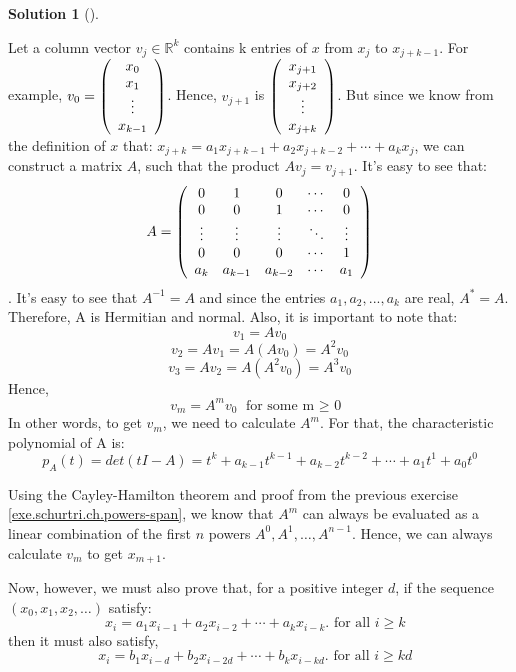 \documentclass[numbers=enddot,12pt,final,onecolumn,notitlepage]{scrartcl}
\newcounter{exer}
\newcounter{sol}
\theoremstyle{definition}
\newtheorem{solu}[sol]{Solution}
\newenvironment{solution}[1][]
{\begin{solu}[#1]\begin{leftbar}}
        {\end{leftbar}\end{solu}}
\begin{document}
\begin{solution}
	Let a column vector $v_j \in \mathbb{R}^k$ contains k entries of $x$ from $x_j$ to $x_{j+k-1}$. For example, $v_0 = \left(\begin{array}[c]{c}
				x_0    \\
				x_1    \\
				\vdots \\
				x_{k-1}
			\end{array}\right)$. Hence, $v_{j+1}$ is
	$\left(\begin{array}[c]{c}
				x_{j+1} \\
				x_{j+2} \\
				\vdots  \\
				x_{j+k}
			\end{array}\right)$.
	But since we know from the definition of $x$ that: $x_{j+k} = a_{1}x_{j+k-1}+a_{2}x_{j+k-2}+\cdots+a_{k}x_{j}$, we can construct a matrix $A$, such that the product $Av_j = v_{j+1}$. It's easy to see that:
	\[
		A = \left(
		\begin{array}
				[c]{ccccc}
				0      & 1       & 0       & \cdots & 0      \\
				0      & 0       & 1       & \cdots & 0      \\
				\vdots & \vdots  & \vdots  & \ddots & \vdots \\
				0      & 0       & 0       & \cdots & 1      \\
				a_{k}  & a_{k-1} & a_{k-2} & \cdots & a_{1}
			\end{array}
		\right)
	\].
	It's easy to see that $A^{-1} = A$ and since the entries $a_1, a_2,...,a_k$ are real, $A^{\ast} = A$. Therefore, A is Hermitian and normal. Also, it is important to note that:
	\[
		v_1 = Av_0
	\]
	\[
		v_2 = Av_1 = A(Av_0) = A^2v_0
	\]
	\[
		v_3 = Av_2 = A(A^2v_0) = A^3v_0
	\]
	Hence,
	\[
		v_m = A^{m}v_0 \text{   for some m $\ge$ 0 }
	\]
	In other words, to get $v_m$, we need to calculate $A^{m}$. For that, the characteristic polynomial of A is:
	\[
		p_A(t) = det(tI - A) = t^k + a_{k-1}t^{k-1} + a_{k-2}t^{k-2} + \cdots + a_1t^{1} + a_0t^{0}
	\]

	Using the Cayley-Hamilton theorem and proof from the previous exercise \ref{exe.schurtri.ch.powers-span}, we know that $A^{m}$ can always be evaluated as a linear combination of the first $n$ powers $A^{0},A^{1},\ldots,A^{n-1}$. Hence, we can always calculate $v_m$ to get $x_{m+1}$.

	Now, however, we must also prove that, for a positive integer $d$, if the sequence $(x_{0},x_{1},x_{2},\ldots)$ satisfy:
	\[
		x_{i}=a_{1}x_{i-1}+a_{2}x_{i-2}+\cdots+a_{k}x_{i-k}. \text{   for all $i \ge k$ }
	\]
	then it must also satisfy,
	\[
		x_{i}=b_{1}x_{i-d}+b_{2}x_{i-2d}+\cdots+b_{k}x_{i-kd}. \text{   for all $i \ge kd$ }
	\]


\end{solution}
\end{document}
